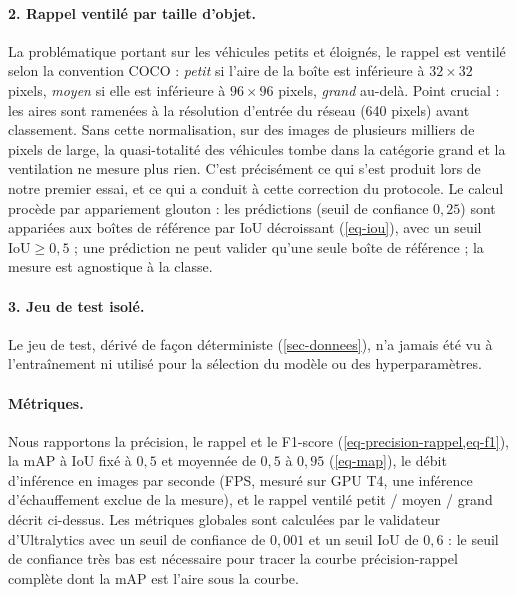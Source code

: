 \paragraph{2. Rappel ventilé par taille d'objet.}
La problématique portant sur les véhicules petits et éloignés, le rappel
est ventilé selon la convention COCO : \emph{petit} si l'aire de la boîte
est inférieure à $32 \times 32$ pixels, \emph{moyen} si elle est
inférieure à $96 \times 96$ pixels, \emph{grand} au-delà. Point crucial :
les aires sont ramenées à la résolution d'entrée du réseau (640 pixels)
avant classement. Sans cette normalisation, sur des images de plusieurs
milliers de pixels de large, la quasi-totalité des véhicules tombe dans
la catégorie \og grand \fg{} et la ventilation ne mesure plus rien.
C'est précisément ce qui s'est produit lors de notre premier essai, et ce
qui a conduit à cette correction du protocole. Le calcul procède par
appariement glouton : les prédictions (seuil de confiance $0{,}25$) sont
appariées aux boîtes de référence par IoU décroissant
(\cref{eq-iou}), avec un seuil $\mathrm{IoU} \geq 0{,}5$ ; une
prédiction ne peut valider qu'une seule boîte de référence ; la mesure
est agnostique à la classe.

\paragraph{3. Jeu de test isolé.}
Le jeu de test, dérivé de façon déterministe
(\cref{sec-donnees}), n'a jamais été vu à l'entraînement ni utilisé pour
la sélection du modèle ou des hyperparamètres.

\paragraph{Métriques.}
Nous rapportons la précision, le rappel et le F1-score
(\cref{eq-precision-rappel,eq-f1}), la mAP à IoU fixé à $0{,}5$ et
moyennée de $0{,}5$ à $0{,}95$ (\cref{eq-map}), le débit d'inférence en
images par seconde (FPS, mesuré sur GPU T4, une inférence d'échauffement
exclue de la mesure), et le rappel ventilé petit / moyen / grand décrit
ci-dessus. Les métriques globales sont calculées par le validateur
d'Ultralytics avec un seuil de confiance de $0{,}001$ et un seuil IoU de
$0{,}6$ : le seuil de confiance très bas est nécessaire pour tracer la
courbe précision-rappel complète dont la mAP est l'aire sous la courbe.

